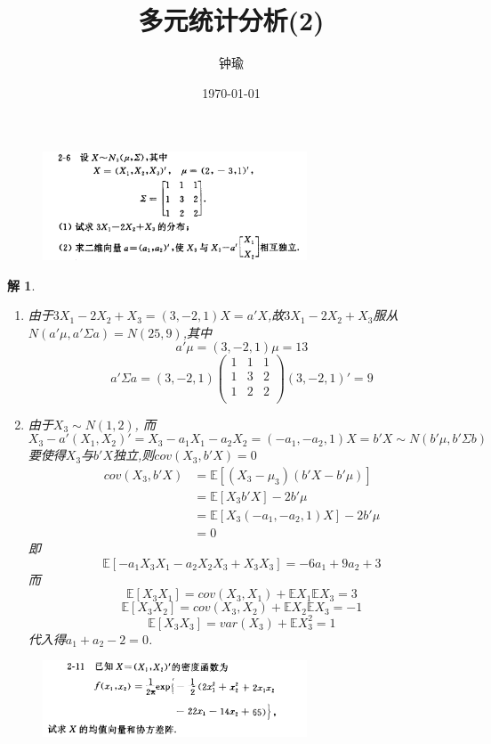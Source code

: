 \documentclass[11pt,a4paper]{ctexart}
\title{多元统计分析(2)}
\author{钟瑜 \quad 222018314210044}
\date{\today}
\newtheorem*{solution}{解}
\begin{document}
	\maketitle
	\pagestyle{plain}%
\begin{figure}[H]
	\includegraphics[width=0.7\textwidth]{1.png}
\end{figure}
\begin{solution}
	\begin{enumerate}
		\item [(1)]由于$ 3X_1-2X_2+X_3=(3,-2,1)X=a'X $,故$ 3X_1-2X_2+X_3 $服从$ N(a'\mu,a'\Sigma a) =N(25,9)$,其中
		\begin{equation}
		a'\mu=(3,-2,1)\mu=13
		\end{equation}
	\[
	a'\Sigma a=(3,-2,1) \left(
	\begin{array}{ccc}
		1& 1 & 1\\
		1& 3 & 2\\
		1& 2 & 2\\
	\end{array} \right)(3,-2,1)'=9
	\]
		\item [(2)] 由于$ X_3\sim N(1,2) $, 而$$ X_3-a'(X_1,X_2)' =X_3-a_1X_1-a_2X_2=(-a_1,-a_2,1)X=b'X\sim N(b'\mu, b'\Sigma b)$$
		要使得$ X_3 $与$ b'X $独立,则$ cov(X_3,b'X)=0 $
		\begin{equation}
			\begin{aligned}
			cov(X_3,b'X) &= \mathbb{E}[(X_3-\mu_3)(b'X-b'\mu)]\\
			&=  \mathbb{E}[X_3b'X]-2b'\mu\\
			&= \mathbb{E}[X_3(-a_1,-a_2,1)X]-2b'\mu\\
			&= 0
			\end{aligned}
		\end{equation}
	即
	$$ \mathbb{E}[-a_1X_3X_1-a_2X_2X_3+X_3X_3]=-6a_1+9a_2+3 $$
	而
	$$\mathbb{E}[X_3X_1]=cov(X_3,X_1)+\mathbb{E}X_1\mathbb{E}X_3=3$$
	$$\mathbb{E}[X_3X_2]=cov(X_3,X_2)+\mathbb{E}X_2\mathbb{E}X_3=-1$$
	$$\mathbb{E}[X_3X_3]=var(X_3)+\mathbb{E}X_3^2=1$$
	代入得$ a_1+a_2-2=0 $.
	\end{enumerate}
\end{solution}
\begin{figure}[H]
	\includegraphics[width=0.7\textwidth]{2.png}
\end{figure}
\end{document}
